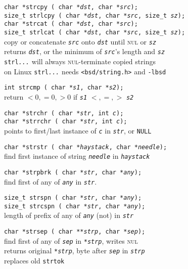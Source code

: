 \documentclass[8pt]{article}
\newcommand{\Cc}[1]{\texttt{#1}}
\newcommand{\ty}[1]{\textcolor{blue!80}{\texttt{#1}}} %
\newcommand{\kv}[1]{\textcolor{red!40!black}{\texttt{#1}}} %
\newcommand{\fn}[1]{\texttt{#1}} %
\newcommand{\var}[1]{\texttt{\textit{#1}}} %
\newcommand{\opt}[1]{\textrm{\textit{#1}}} %
\newcommand{\htab}{\hspace*{2em}} %
\begin{document}
\begin{multicols}{3}
\Cc{\ty{char *}\fn{strcpy}\,(%
    \ty{char *}\var{dst}, %
    \ty{char *}\var{src});} \\
\Cc{\ty{size\_t} \fn{strlcpy}\,(%
    \ty{char *}\var{dst}, %
    \ty{char *}\var{src}, %
    \ty{size\_t} \var{sz});} \\
\Cc{\ty{char *}\fn{strcat}\,(%
    \ty{char *}\var{dst}, %
    \ty{char *}\var{src});} \\
\Cc{\ty{size\_t} \fn{strlcat}\,(%
    \ty{char *}\var{dst}, %
    \ty{char *}\var{src}, %
    \ty{size\_t} \var{sz});} \\
\htab copy or concatenate \var{src} onto \var{dst} until \textsc{nul} or \var{sz} \\
\htab returns \var{dst}, or the minimum of \var{src}'s length and \var{sz} \\
\htab \fn{strl\opt{...}} will always \textsc{nul}-terminate copied strings \\
\htab on Linux \fn{strl\opt{...}} needs \Cc{<bsd/string.h>} and \texttt{-lbsd}

\Cc{\ty{int} \fn{strcmp}\,(%
    \ty{char *}\var{s1}, %
    \ty{char *}\var{s2}); }\\
\htab return $<0,=0,>0$ if \var{s1} $<,=,>$ \var{s2}

\Cc{\ty{char *}\fn{strchr}\,(%
    \ty{char *}\var{str}, %
    \ty{int} \var{c});} \\
\Cc{\ty{char *}\fn{strrchr}\,(%
    \ty{char *}\var{str}, %
    \ty{int} \var{c});} \\
\htab points to first/last instance of \var{c} in \var{str}, or \kv{NULL}

\Cc{\ty{char *}\fn{strstr}\,(%
    \ty{char *}\var{haystack}, %
    \ty{char *}\var{needle});} \\
\htab find first instance of string \var{needle} in \var{haystack}

\Cc{\ty{char *}\fn{strpbrk}\,(%
    \ty{char *}\var{str},
    \ty{char *}\var{any}); } \\
\htab find first of any of \var{any} in \var{str}.

\Cc{\ty{size\_t} \fn{strspn}\,(%
    \ty{char *}\var{str},
    \ty{char *}\var{any}); } \\
\Cc{\ty{size\_t} \fn{strcspn}\,(%
    \ty{char *}\var{str},
    \ty{char *}\var{any}); } \\
\htab length of prefix of any of \var{any} (not) in \var{str}

\Cc{\ty{char *}\fn{strsep}\,(%
    \ty{char **}\var{strp}, %
    \ty{char *}\var{sep});} \\
\htab find first of any of \var{sep} in \var{*strp}, writes \textsc{nul} \\
\htab returns original \var{*strp}, byte after \var{sep} in \var{strp} \\
\htab replaces old \fn{strtok}

\end{multicols}
\end{document}
